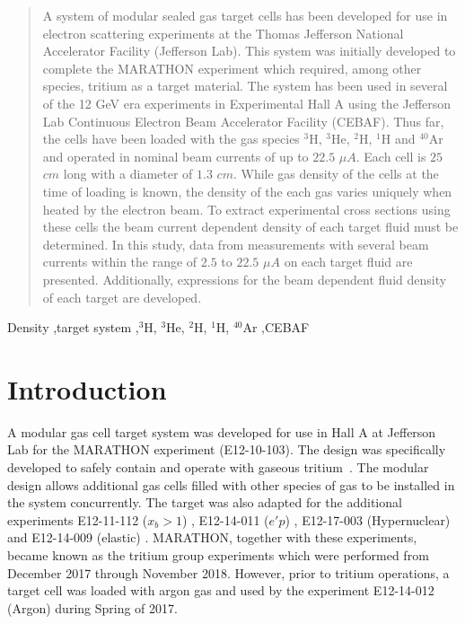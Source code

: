 \documentclass[final,5p,times,twocolumn]{elsarticle}
\begin{document}
\begin{frontmatter}
\begin{abstract}
A system of modular sealed gas target cells has been developed for use in electron scattering experiments 
at the Thomas Jefferson National Accelerator Facility (Jefferson Lab). This system was initially developed 
to complete the MARATHON experiment which required, among other species, tritium as a target material. 
The system has been used in several of the 12 GeV era experiments in Experimental Hall A using the Jefferson Lab 
Continuous Electron Beam Accelerator Facility (CEBAF). Thus far, the cells have been loaded with the gas 
species $^{3}$H, $^{3}$He, $^{2}$H, $^{1}$H and $^{40}$Ar and operated in nominal beam currents of up to $22.5$ $\mu A$.  
Each cell is $25$ $cm$ long with a diameter of $1.3$ $cm$. While gas density of the cells at the time of loading is known, 
the density of the each gas varies uniquely when heated by the electron beam. To extract experimental cross sections using 
these cells the beam current dependent density of each target fluid must be determined. In this study, data from measurements 
with several beam currents within the range of $2.5$ to $22.5$ $\mu A$ on each target fluid are presented. Additionally, 
expressions for the beam dependent fluid density of each target are developed.
\end{abstract}

\begin{keyword}
Density \sep target system
\sep $^{3}$H, $^{3}$He, $^{2}$H, $^{1}$H, $^{40}$Ar
\sep CEBAF
\end{keyword}
\end{frontmatter}


\section{Introduction}
\label{}

A modular gas cell target system was developed for use in Hall A at Jefferson Lab for the MARATHON experiment (E12-10-103)\cite{marathon}. The design was specifically developed to safely contain and operate with gaseous tritium~\cite{Braj:2013}. The modular design allows additional gas cells filled with other species of gas to be installed in the system concurrently. The target was also adapted for the additional experiments E12-11-112 ($x_{b}>1$) \cite{E12-11-112}, E12-14-011 ($e'p$) \cite{E12-14-011}, E12-17-003 (Hypernuclear) \cite{hypernuclear} and E12-14-009 (elastic) \cite{E12-14-009}.  MARATHON, together with these experiments, became known as the tritium group experiments which were performed from December 2017 through November 2018. However, prior to tritium operations, a target cell was loaded with argon gas and used by the experiment E12-14-012 (Argon) \cite{E12-14-012} during Spring of 2017. 
\end{document}
